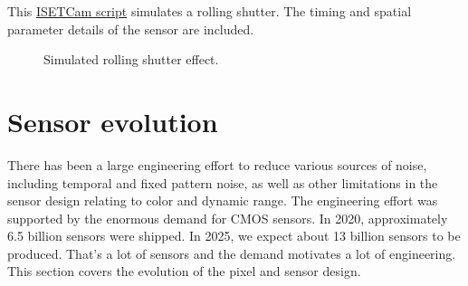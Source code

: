 \documentclass[
  letterpaper,
]{book}
\begin{document}
\begin{tcolorbox}[enhanced jigsaw, opacityback=0, breakable, coltitle=black, leftrule=.75mm, left=2mm, colframe=quarto-callout-note-color-frame, opacitybacktitle=0.6, bottomtitle=1mm, bottomrule=.15mm, toprule=.15mm, title=\textcolor{quarto-callout-note-color}{\faInfo}\hspace{0.5em}{Rolling shutter simulation}, titlerule=0mm, toptitle=1mm, colback=white, rightrule=.15mm, colbacktitle=quarto-callout-note-color!10!white, arc=.35mm]

This \href{../code/03Sensor/fise_sensorRollingShutter.html}{ISETCam
script} simulates a rolling shutter. The timing and spatial parameter
details of the sensor are included.

\begin{figure}[H]


\caption{\label{fig-rolling-shutter-simulated}Simulated rolling shutter
effect.}

\end{figure}%

\end{tcolorbox}

\section{Sensor evolution}\label{sec-sensor-evolution}

There has been a large engineering effort to reduce various sources of
noise, including temporal and fixed pattern noise, as well as other
limitations in the sensor design relating to color and dynamic range.
The engineering effort was supported by the enormous demand for CMOS
sensors. In 2020, approximately 6.5 billion sensors were shipped. In
2025, we expect about 13 billion sensors to be produced. That's a lot of
sensors and the demand motivates a lot of engineering. This section
covers the evolution of the pixel and sensor design.
\end{document}
